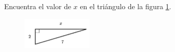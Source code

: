 \question[15]  Encuentra el valor de $x$ en el triángulo de la figura \ref{fig:lados_pitagoras_28}.
\begin{figure}[H]
    \begin{center}
        \includegraphics[width=0.3\textwidth]{../images/lados_pitagoras_28.png}
    \end{center}
    \caption{}
    \label{fig:lados_pitagoras_28}
\end{figure}
